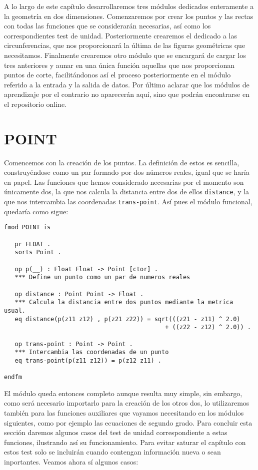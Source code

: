 
A lo largo de este capítulo desarrollaremos tres módulos dedicados enteramente a la geometría en dos dimensiones. Comenzaremos por crear los puntos y las rectas con todas las funciones que se considerarán necesarias, así como los correspondientes test de unidad. Posteriormente crearemos el dedicado a las circunferencias, que nos proporcionará la última de las figuras geométricas que necesitamos. Finalmente crearemos otro módulo que se encargará de cargar los tres anteriores y aunar en una única función aquellas que nos proporcionan puntos de corte, facilitándonos así el proceso posteriormente en el módulo referido a la entrada y la salida de datos. Por último aclarar que los módulos de aprendizaje por el contrario no aparecerán aquí, sino que podrán encontrarse en el repositorio online.


\section{POINT}

Comencemos con la creación de los puntos. La definición de estos es sencilla, construyéndose como un par formado por dos números reales, igual que se haría en papel. Las funciones que hemos considerado necesarias por el momento son únicamente dos, la que nos calcula la distancia entre dos de ellos \texttt{distance}, y la que nos intercambia las coordenadas \texttt{trans-point}. Así pues el módulo funcional, quedaría como sigue:
{\codesize
\begin{verbatim}
fmod POINT is

   pr FLOAT .
   sorts Point .

   op p(__) : Float Float -> Point [ctor] .
   *** Define un punto como un par de numeros reales

   op distance : Point Point -> Float .
   *** Calcula la distancia entre dos puntos mediante la metrica usual.
   eq distance(p(z11 z12) , p(z21 z22)) = sqrt(((z21 - z11) ^ 2.0) 
                                             + ((z22 - z12) ^ 2.0)) .

   op trans-point : Point -> Point .
   *** Intercambia las coordenadas de un punto
   eq trans-point(p(z11 z12)) = p(z12 z11) .

endfm
\end{verbatim}
}

El módulo queda entonces completo aunque resulta muy simple, sin embargo, como será necesario importarlo para la creación de los otros dos, lo utilizaremos también para las funciones auxiliares que vayamos necesitando en los módulos siguientes, como por ejemplo las ecuaciones de segundo grado. Para concluir esta sección daremos algunos casos del test de unidad correspondiente a estas funciones, ilustrando así su funcionamiento. Para evitar saturar el capítulo con estos test solo se incluirán cuando contengan información nueva o sean inportantes. Veamos ahora sí algunos casos:\par

